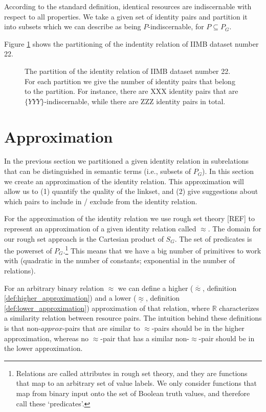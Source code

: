 \documentclass[letterpaper]{article}
\begin{document}
According to the standard definition, identical resources are indiscernable with respect to all properties. We take a given set of identity pairs and partition it into subsets which we can describe as being $P$-indiscernable, for $P \subseteq P_G$.

Figure \ref{fig:indiscernability_iimb} shows the partitioning of the indentity relation of IIMB dataset number 22.

\begin{figure}
\label{fig:indiscernability_iimb}
\caption{The partition of the identity relation of IIMB dataset number 22. For each partition we give the number of identity pairs that belong to the partition. For instance, there are XXX identity pairs that are $\{ YYY \}$-indiscernable, while there are ZZZ identity pairs in total.}
\end{figure}

\section{Approximation}
\label{sec:approximation}

In the previous section we partitioned a given identity relation in subrelations that can be distinguished in semantic terms (i.e., subsets of $P_G$). In this section we create an approximation of the identity relation. This approximation will allow us to (1) quantify the quality of the linkset, and (2) give suggestions about which pairs to include in / exclude from the identity relation.

For the approximation of the identity relation we use rough set theory [REF] to represent an approximation of a given identity relation called $\approx$. The domain for our rough set approach is the Cartesian product of $S_G$. The set of predicates is the powerset of $P_G$.\footnote{Relations are called attributes in rough set theory, and they are functions that map to an arbitrary set of value labels. We only consider functions that map from binary input onto the set of Boolean truth values, and therefore call these `predicates'.} This means that we have a big number of primitives to work with (quadratic in the number of constants; exponential in the number of relations).

For an arbitrary binary relation $\approx$ we can define a higher ($\overline{\approx}$, definition \ref{def:higher_approximation}) and a lower ($\underline{\approx}$, definition \ref{def:lower_approximation}) approximation of that relation, where $\mathbb{R}$ characterizes a similarity relation between resource pairs. The intuition behind these definitions is that non-$approx$-pairs that are similar to $\approx$-pairs should be in the higher approximation, whereas no $\approx$-pair that has a similar non-$\approx$-pair should be in the lower approximation.
\end{document}
